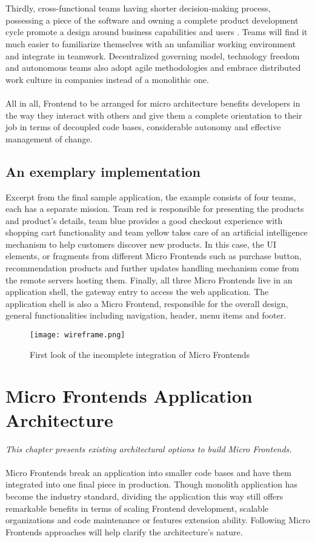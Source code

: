 \documentclass[a4paper]{book}
\begin{document}
\\ \\
Thirdly, cross-functional teams having shorter decision-making process, possessing a piece of the software and owning a complete product development cycle promote a design around business capabilities and users . Teams will find it much easier to familiarize themselves with an unfamiliar working environment and integrate in teamwork. Decentralized governing model, technology freedom and autonomous teams also adopt agile methodologies and embrace distributed work culture in companies instead of a monolithic one.
\\ \\
All in all, Frontend to be arranged for micro architecture benefits developers in the way they interact with others and give them a complete orientation to their job in terms of decoupled code bases, considerable autonomy and effective management of change. 

\section{An exemplary implementation}
Excerpt from the final sample application, the example consists of four teams, each has a separate mission. Team red is responsible for presenting the products and product's details, team blue provides a good checkout experience with shopping cart functionality and team yellow takes care of an artificial intelligence mechanism to help customers discover new products. In this case, the UI elements, or fragments from different Micro Frontends such as purchase button, recommendation products and further updates handling mechanism come from the remote servers hosting them. Finally, all three Micro Frontends live in an application shell, the gateway entry to access the web application. The application shell is also a Micro Frontend, responsible for the overall design, general functionalities including navigation, header, menu items and footer.
\begin{figure}[h!]
    \centering
    \captionsetup{justification=centering}
    \texttt{[image: wireframe.png]}
    \caption{First look of the incomplete integration of Micro Frontends}
    \label{fig:wireframe}
\end{figure}



\chapter{Micro Frontends Application Architecture}
\textit{This chapter presents existing architectural options to build Micro Frontends.}
\\ \\
Micro Frontends break an application into smaller code bases and have them integrated into one final piece in production. Though monolith application has become the industry standard, dividing the application this way still offers remarkable benefits in terms of scaling Frontend development, scalable organizations and code maintenance or features extension ability. Following Micro Frontends approaches will help clarify the architecture’s nature.
\end{document}
